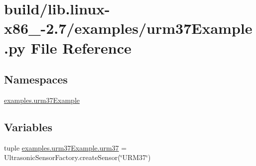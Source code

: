 \hypertarget{build_2lib_8linux-x86__64-2_87_2examples_2urm37Example_8py}{}\section{build/lib.linux-\/x86\+\_-\/2.7/examples/urm37\+Example.py File Reference}
\label{build_2lib_8linux-x86__64-2_87_2examples_2urm37Example_8py}
\subsection*{Namespaces}
\begin{DoxyCompactItemize}
\item 
 \hyperlink{namespaceexamples_1_1urm37Example}{examples.\+urm37\+Example}
\end{DoxyCompactItemize}
\subsection*{Variables}
\begin{DoxyCompactItemize}
\item 
tuple \hyperlink{namespaceexamples_1_1urm37Example_a725cbcda6667a4a21c268032db9e19f4}{examples.\+urm37\+Example.\+urm37} = Ultrasonic\+Sensor\+Factory.\+create\+Sensor(\char`\"{}U\+R\+M37\char`\"{})
\end{DoxyCompactItemize}
